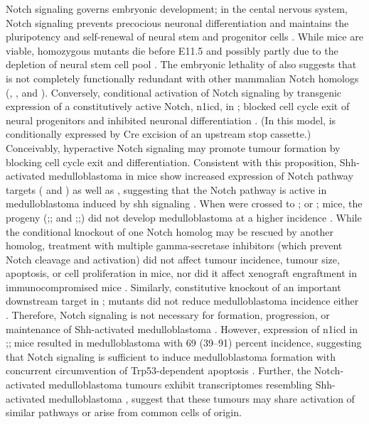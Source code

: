 Notch signaling  governs embryonic development; in the cental nervous system, Notch signaling prevents precocious neuronal differentiation and maintains the pluripotency and self-renewal of neural stem and progenitor cells . While \high{+/-} mice are viable, homozygous  mutants die before E11.5 and possibly partly due to the depletion of neural stem cell pool . The embryonic lethality of \high{-/-} also suggests that  is not completely functionally redundant with other mammalian Notch homologs (, , and ). Conversely, conditional activation of Notch signaling by transgenic expression of a constitutively active Notch, \gls{n1icd}, in ; blocked cell cycle exit of neural progenitors and inhibited neuronal differentiation . (In this model,  is conditionally expressed by Cre excision of an upstream stop cassette.) Conceivably, hyperactive Notch signaling may promote tumour formation by blocking cell cycle exit and differentiation. Consistent with this proposition, Shh-activated medulloblastoma in  mice show increased expression of Notch pathway targets ( and ) as well as , suggesting that the Notch pathway is active in medulloblastoma induced by \gls{shh} signaling . When  were crossed to ; or ; mice, the progeny (;; and ;;) did not develop medulloblastoma at a higher incidence . While the conditional knockout of one Notch homolog may be rescued by another homolog, treatment with multiple gamma-secretase inhibitors (which prevent Notch cleavage and activation) did not affect tumour incidence, tumour size, apoptosis, or cell proliferation in  mice, nor did it affect xenograft engraftment in immunocompromised mice . Similarly, constitutive knockout of an important downstream target  in ;\high{-/-} mutants did not reduce medulloblastoma incidence either . Therefore, Notch signaling is not necessary for formation, progression, or maintenance of Shh-activated medulloblastoma . However, expression of \gls{n1icd} in ;;\high{-/-}mice resulted in medulloblastoma with 69 (39--91) percent incidence, suggesting that Notch signaling is sufficient to induce medulloblastoma formation with concurrent circumvention of Trp53-dependent apoptosis . Further, the Notch-activated medulloblastoma tumours exhibit transcriptomes resembling Shh-activated medulloblastoma , suggest that these tumours may share activation of similar pathways or arise from common cells of origin.

